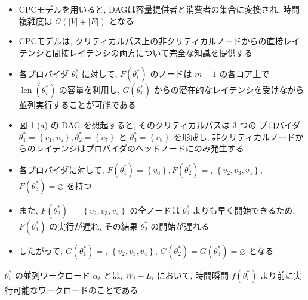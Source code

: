 \begin{frame}{}
    \begin{itemize}
        \item CPCモデルを用いると, DAGは容量提供者と消費者の集合に変換され, 時間複雑度は $\mathcal{O}(|V|+|E|)$ となる
        \item CPCモデルは, クリティカルパス上の非クリティカルノードからの直接レイテンシと間接レイテンシの両方について完全な知識を提供する
        \item 各プロバイダ $\theta_{i}^{*}$ に対して, $F\left(\theta_{i}^{*}\right)$ のノードは $m-1$ の各コア上で $\operatorname{len}\left(\theta_{i}^{*}\right)$ の容量を利用し, $G\left(\theta_{i}^{*}\right)$ からの潜在的なレイテンシを受けながら並列実行することが可能である
    \end{itemize}
\end{frame}

\begin{frame}{}
    \begin{itemize}
        \item 図 1 (a) の DAG を想起すると, そのクリティカルパスは 3 つの プロバイダ $\theta_{1}^{*}=\left\{v_{1}, v_{5}\right\}, \theta_{2}^{*}=\left\{v_{7}\right\}$ と $\theta_{3}^{*}=\left\{v_{8}\right\}$ を形成し, 非クリティカルノードからのレイテンシはプロバイダのヘッドノードにのみ発生する
        \item 各プロバイダに対して, $F\left(\theta_{1}^{*}\right)=\left\{v_{6}\right\}, F\left(\theta_{2}^{*}\right)=$, $\left\{v_{2}, v_{3}, v_{4}\right\}$, $F\left(\theta_{3}^{*}\right)=\varnothing$ を持つ
        \item また, $F\left(\theta_{2}^{*}\right)=$  $\left\{v_{2}, v_{3}, v_{4}\right\}$ の全ノードは $\theta_{2}^{*}$ よりも早く開始できるため, $F\left(\theta_{1}^{*}\right)$ の実行が遅れ, その結果 $\theta_{2}^{*}$ の開始が遅れる
        \item したがって, $G\left(\theta_{1}^{*}\right)=$, $\left\{v_{2}, v_{3}, v_{4}\right\}$, $G\left(\theta_{2}^{*}\right)=G\left(\theta_{3}^{*}\right)=\varnothing$ となる
    \end{itemize}
\end{frame}

\begin{frame}{}
    \begin{definition}
        $\theta_{i}^{*}$ の並列ワークロード $\alpha_{i}$ とは, $W_{i}-L_{i}$ において, 時間瞬間 $f\left(\theta_{i}^{*}\right)$ より前に実行可能なワークロードのことである
    \end{definition}
\end{frame}

